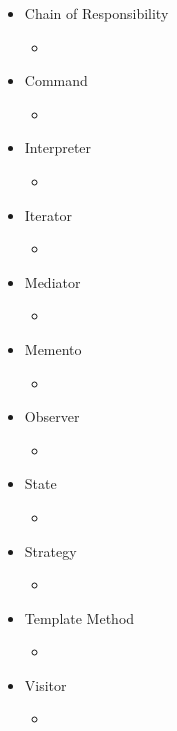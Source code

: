 \documentclass[dvipdfmx]{jsarticle}
\begin{document}
\begin{itemize}
  \item Chain of Responsibility
  \begin{itemize}
    \item
  \end{itemize}
  \item Command
  \begin{itemize}
    \item
  \end{itemize}
  \item Interpreter
  \begin{itemize}
    \item
  \end{itemize}
  \item Iterator
  \begin{itemize}
    \item
  \end{itemize}
  \item Mediator
  \begin{itemize}
    \item
  \end{itemize}
  \item Memento
  \begin{itemize}
    \item
  \end{itemize}
  \item Observer
  \begin{itemize}
    \item
  \end{itemize}
  \item State
  \begin{itemize}
    \item
  \end{itemize}
  \item Strategy
  \begin{itemize}
    \item
  \end{itemize}
  \item Template Method
  \begin{itemize}
    \item
  \end{itemize}
  \item Visitor
  \begin{itemize}
    \item
  \end{itemize}
\end{itemize}
\end{document}
